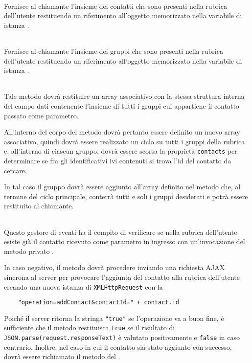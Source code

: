 \begin{description}
\item{}\\
Fornisce al chiamante l'insieme dei contatti che sono presenti nella rubrica dell'utente restituendo un riferimento all'oggetto memorizzato nella variabile di istanza .

\item{}\\
Fornisce al chiamante l'insieme dei gruppi che sono presenti nella rubrica dell'utente restituendo un riferimento all'oggetto memorizzato nella variabile di istanza .

\item{}\\
Tale metodo dovrà restituire un array associativo con la stessa struttura interna del campo dati  contenente l'insieme di tutti i gruppi cui appartiene il contatto passato come parametro.

All'interno del corpo del metodo dovrà pertanto essere definito un nuovo array associativo, quindi dovrà essere realizzato un ciclo su tutti i gruppi della rubrica e, all'interno di ciascun gruppo, dovrà essere scorsa la proprietà \verb'contacts' per determinare se fra gli identificativi ivi contenuti si trova l'id del contatto da cercare.

In tal caso il gruppo dovrà essere aggiunto all'array definito nel metodo che, al termine del ciclo principale, conterrà tutti e soli i gruppi desiderati e potrà essere restituito al chiamante.

\item{}\\
Questo gestore di eventi ha il compito di verificare se nella rubrica dell'utente esiste già il contatto ricevuto come parametro in ingresso con un'invocazione del metodo privato . 

In caso negativo, il metodo dovrà procedere inviando una richiesta AJAX sincrona al server per provocare l'aggiunta del contatto alla rubrica dell'utente creando una nuova istanza di \verb'XMLHttpRequest' con la 
\begin{verbatim}
    "operation=addContact&contactId=" + contact.id
\end{verbatim}

Poiché il server ritorna la stringa \verb'"true"' se l'operazione va a buon fine, è sufficiente che il metodo restituisca \texttt{true} se il risultato di \verb'JSON.parse(request.responseText)' è valutato positivamente e \verb'false' in caso contrario. Inoltre, nel caso in cui il contatto sia stato aggiunto con successo, dovrà essere richiamato il metodo  del .


\end{description}
